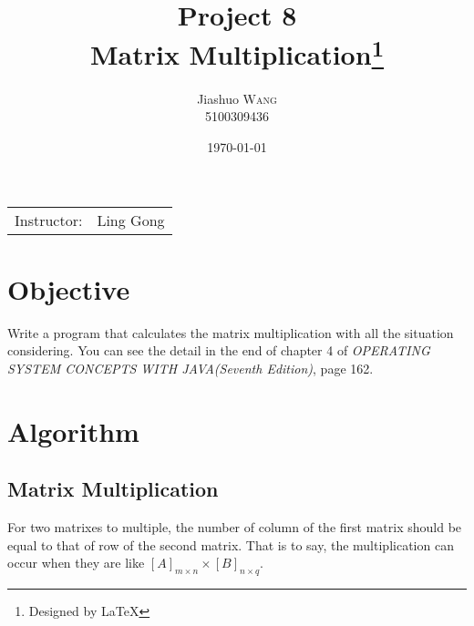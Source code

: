 \documentclass{article}
\title{Project 8 \\ Matrix Multiplication\thanks{Designed by \LaTeX}} %
\author{Jiashuo \textsc{Wang} \\ 5100309436} %
\date{\today} %
\begin{document}
\maketitle %
\thispagestyle{fancy} %

\begin{center}
\begin{tabular}{l r}
Instructor: & Ling Gong %
\end{tabular}
\end{center}




\section{Objective}

Write a program that calculates the matrix multiplication with all the situation considering. You can see the detail in the end of chapter 4 of \emph{OPERATING SYSTEM CONCEPTS WITH JAVA(Seventh Edition)}, page 162.




\section{Algorithm}

\subsection{Matrix Multiplication}
For two matrixes to multiple, the number of column of the first matrix should be equal to that of row of the second matrix. That is to say, the multiplication can occur when they are like $[A]_{m\times n}\times[B]_{n\times q}$.
\end{document}
